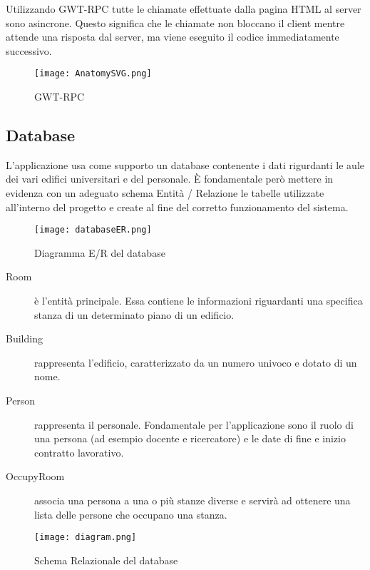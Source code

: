 
Utilizzando  GWT-RPC  tutte  le  chiamate  effettuate  dalla  pagina  HTML  al  server 
sono  asincrone.
Questo  significa  che  le  chiamate  non  bloccano  il  client  mentre attende   una 
risposta   dal   server,   ma   viene  eseguito   il   codice   immediatamente 
successivo.
\FloatBarrier
\begin{figure}[!htb]
\centering%
\texttt{[image: AnatomySVG.png]}%
\caption{GWT-RPC }\label{fig:GWT-RPC}%
\end{figure}

\FloatBarrier
\subsection{Database}

L'applicazione usa come supporto un database contenente i dati rigurdanti le aule dei vari edifici universitari e del personale.
\`E fondamentale però mettere in evidenza con un adeguato schema Entità / Relazione le 
tabelle utilizzate all’interno del progetto e create al fine del corretto funzionamento del 
sistema.

\begin{figure}[!htb]
\centering
\texttt{[image: databaseER.png]}
\caption{Diagramma E/R del database}\label{fig:database}
\end{figure}

\FloatBarrier
\begin{description}
\item[Room]\`e l'entit\`a principale. Essa contiene le informazioni riguardanti una specifica stanza di un determinato piano di un edificio. 
\item[Building]rappresenta l'edificio, caratterizzato da un numero univoco e dotato di un nome.
\item[Person]rappresenta il personale. Fondamentale per l'applicazione sono il ruolo di una persona (ad esempio docente e ricercatore) e le date di fine e inizio contratto lavorativo.
\item[OccupyRoom]associa una persona a una o pi\`u stanze diverse e  servir\`a ad ottenere una lista delle persone che occupano una stanza.
\end{description}

\begin{figure}[!htb]
\centering
\texttt{[image: diagram.png]}
\caption{Schema Relazionale del database}\label{fig:databaseSchema}
\end{figure}